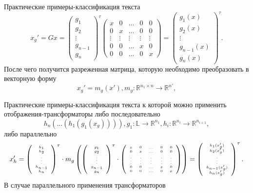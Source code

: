 \documentclass{beamer}
\begin{document}
\begin{darkframes}
\begin{frame}{Практические примеры-классификация текста}
$$x_g' = Gx =
\left(
\begin{array}{c}
g_1 \\
g_2\\
\vdots \\
g_{n-1}\\ 
g_{n}
\end{array}
\right)^{\tau}
\left(
\begin{array}{ccccc}
x & 0 & ... &  0 & 0 \\
0 & x & ... & 0 & 0 \\
\vdots & \vdots & \vdots & \vdots & \vdots \\
0 & 0 & ... & x & 0 \\
0 & 0 & ... & 0 & x
\end{array}
\right)  = 
\left(
\begin{array}{c}
g_1(x) \\
g_2(x)\\
\vdots \\
g_{n-1}(x)\\ 
g_n(x)
\end{array}
\right)^{\tau}.
$$ 
После чего получится разреженная матрица, которую необходимо преобразовать в векторную форму
$$x_{g}' = m_g(x'), m_g : \mathbb{R}^{n_1 \times n} \to \mathbb{R}^{n'},$$
		\end{frame}
		\begin{frame}{Практические примеры-классификация текста}
			к которой можно применить отображения-трансформаторы либо последовательно
$$h_n(...(h_1(g_1(x_{g})))), g_1 : \mathbb{L} \to \mathbb{R}^{n_1}, h_i:\mathbb{R}^{n_{i}} \to \mathbb{R}^{n_{i+1}},$$
либо параллельно
$$\tiny{x'_h  =
\left(
\begin{array}{c}
h_1 \\
h_2\\
\vdots \\
h_{n-1}\\ 
h_{n}
\end{array}
\right)^{\tau}
\cdot
m_g
\left(\left(
\begin{array}{c}
g_1 \\
g_2\\
\vdots \\
g_{n-1}\\ 
g_{n}
\end{array}
\right)^{\tau}
\cdot\left(
\begin{array}{ccccc}
x & 0 & ... &  0 & 0 \\
0 & x & ... & 0 & 0 \\
\vdots & \vdots & \vdots & \vdots & \vdots \\
0 & 0 & ... & x & 0 \\
0 & 0 & ... & 0 & x
\end{array}
\right) \right)  = 
\left(
\begin{array}{c}
h_1(x'_g) \\
h_2(x'_g)\\
\vdots \\
h_{n-1}(x'_g)\\ 
h_n(x'_g)
\end{array}
\right)^{\tau}.}
$$ 
В случае параллельного применения трансформаторов


\end{frame}
\end{darkframes}
\end{document}
